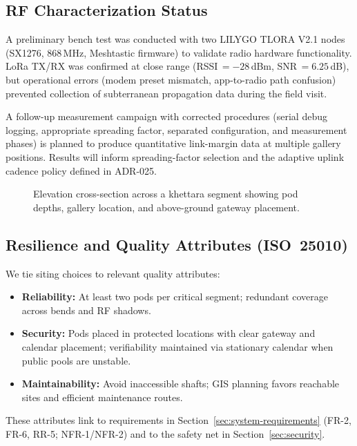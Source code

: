 \subsection{RF Characterization Status}
\label{subsec:rf-characterization}

A preliminary bench test was conducted with two LILYGO TLORA V2.1 nodes
(SX1276, 868\,MHz, Meshtastic firmware) to validate radio hardware functionality.
\ac{LoRa} TX/RX was confirmed at close range (RSSI\,$= -28$\,dBm, SNR\,$= 6.25$\,dB),
but operational errors (modem preset mismatch, app-to-radio path confusion)
prevented collection of subterranean propagation data during the field visit.

A follow-up measurement campaign with corrected procedures (serial debug logging,
appropriate spreading factor, separated configuration, and measurement phases)
is planned to produce quantitative link-margin data at multiple gallery positions.
Results will inform spreading-factor selection and the adaptive uplink cadence
policy defined in \ac{ADR}-025.

\begin{figure}[H]
  \centering
  \caption{Elevation cross-section across a khettara segment showing pod depths, gallery location, and above-ground gateway placement.}
  \label{fig:dem-cross-section}
\end{figure}

\subsection[Resilience and Quality Attributes (ISO 25010)]{Resilience and Quality Attributes (ISO~25010)}\label{subsec:resilience-and-quality-attributes-(iso25010)}
We tie siting choices to relevant quality attributes:
\begin{itemize}[nosep]
  \item \textbf{Reliability:} At least two pods per critical segment; redundant coverage across bends and RF shadows.
  \item \textbf{Security:} Pods placed in protected locations with clear gateway and calendar placement; verifiability maintained via stationary calendar when public pools are unstable.
  \item \textbf{Maintainability:} Avoid inaccessible shafts; \ac{GIS} planning favors reachable sites and efficient maintenance routes.
\end{itemize}
These attributes link to requirements in Section~\ref{sec:system-requirements} (FR-2, FR-6, RR-5; NFR-1/NFR-2) and to the safety net in Section~\ref{sec:security}.

